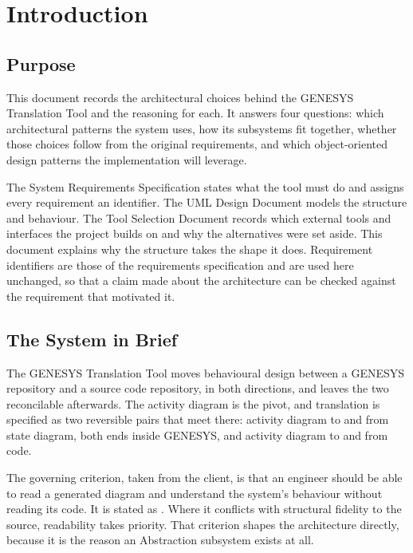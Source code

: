 \chapter{Introduction}
\label{ch:intro}

\section{Purpose}

This document records the architectural choices behind the GENESYS Translation
Tool and the reasoning for each. It answers four questions: which architectural
patterns the system uses, how its subsystems fit together, whether those choices
follow from the original requirements, and which object-oriented design patterns
the implementation will leverage.

The System Requirements Specification
states what the tool must do and assigns every requirement an identifier. The
UML Design Document models the structure and behaviour. The Tool Selection
Document records which external tools and interfaces the project builds on and
why the alternatives were set aside. This document explains why the structure
takes the shape it does. Requirement identifiers are those of
the requirements specification and are used here unchanged, so that a claim made
about the architecture can be checked against the requirement that motivated it.

\section{The System in Brief}

The GENESYS Translation Tool moves behavioural design between a GENESYS
repository and a source code repository, in both directions, and leaves the two
reconcilable afterwards. The activity diagram is the pivot, and translation is
specified as two reversible pairs that meet there: activity diagram to and from
state diagram, both ends inside GENESYS, and activity diagram to and from code.

The governing criterion, taken from the client, is that an engineer should be
able to read a generated diagram and understand the system's behaviour without
reading its code. It is stated as . Where it conflicts with
structural fidelity to the source, readability takes priority. That criterion
shapes the architecture directly, because it is the reason an Abstraction
subsystem exists at all.

